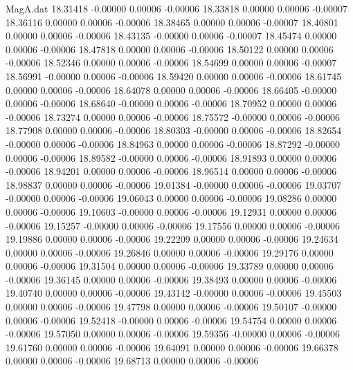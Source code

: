 \begin{filecontents}{MagA.dat}
  18.31418   -0.00000    0.00006   -0.00006
  18.33818    0.00000    0.00006   -0.00007
  18.36116    0.00000    0.00006   -0.00006
  18.38465    0.00000    0.00006   -0.00007
  18.40801    0.00000    0.00006   -0.00006
  18.43135   -0.00000    0.00006   -0.00007
  18.45474    0.00000    0.00006   -0.00006
  18.47818    0.00000    0.00006   -0.00006
  18.50122    0.00000    0.00006   -0.00006
  18.52346    0.00000    0.00006   -0.00006
  18.54699    0.00000    0.00006   -0.00007
  18.56991   -0.00000    0.00006   -0.00006
  18.59420    0.00000    0.00006   -0.00006
  18.61745    0.00000    0.00006   -0.00006
  18.64078    0.00000    0.00006   -0.00006
  18.66405   -0.00000    0.00006   -0.00006
  18.68640   -0.00000    0.00006   -0.00006
  18.70952    0.00000    0.00006   -0.00006
  18.73274    0.00000    0.00006   -0.00006
  18.75572   -0.00000    0.00006   -0.00006
  18.77908    0.00000    0.00006   -0.00006
  18.80303   -0.00000    0.00006   -0.00006
  18.82654   -0.00000    0.00006   -0.00006
  18.84963    0.00000    0.00006   -0.00006
  18.87292   -0.00000    0.00006   -0.00006
  18.89582   -0.00000    0.00006   -0.00006
  18.91893    0.00000    0.00006   -0.00006
  18.94201    0.00000    0.00006   -0.00006
  18.96514    0.00000    0.00006   -0.00006
  18.98837    0.00000    0.00006   -0.00006
  19.01384   -0.00000    0.00006   -0.00006
  19.03707   -0.00000    0.00006   -0.00006
  19.06043    0.00000    0.00006   -0.00006
  19.08286    0.00000    0.00006   -0.00006
  19.10603   -0.00000    0.00006   -0.00006
  19.12931    0.00000    0.00006   -0.00006
  19.15257   -0.00000    0.00006   -0.00006
  19.17556    0.00000    0.00006   -0.00006
  19.19886    0.00000    0.00006   -0.00006
  19.22209    0.00000    0.00006   -0.00006
  19.24634    0.00000    0.00006   -0.00006
  19.26846    0.00000    0.00006   -0.00006
  19.29176    0.00000    0.00006   -0.00006
  19.31504    0.00000    0.00006   -0.00006
  19.33789    0.00000    0.00006   -0.00006
  19.36145    0.00000    0.00006   -0.00006
  19.38493    0.00000    0.00006   -0.00006
  19.40740    0.00000    0.00006   -0.00006
  19.43142   -0.00000    0.00006   -0.00006
  19.45503    0.00000    0.00006   -0.00006
  19.47798    0.00000    0.00006   -0.00006
  19.50107   -0.00000    0.00006   -0.00006
  19.52418   -0.00000    0.00006   -0.00006
  19.54754    0.00000    0.00006   -0.00006
  19.57050    0.00000    0.00006   -0.00006
  19.59356   -0.00000    0.00006   -0.00006
  19.61760    0.00000    0.00006   -0.00006
  19.64091    0.00000    0.00006   -0.00006
  19.66378    0.00000    0.00006   -0.00006
  19.68713    0.00000    0.00006   -0.00006

\end{filecontents}

